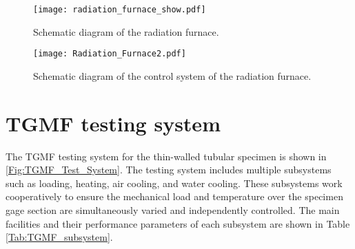 \begin{figure}[!htp]
	\centering
	\texttt{[image: radiation\_furnace\_show.pdf]}
	\caption{Schematic diagram of the radiation furnace.}
	\label{Fig:radiation_furnace_show}
\end{figure}

\begin{figure}[!htp]
	\centering
	\texttt{[image: Radiation\_Furnace2.pdf]}
	\caption{Schematic diagram of the control system of the radiation furnace.}
	\label{Fig:Radiation_Furnace}
\end{figure}





\section{TGMF testing system}
\noindent
The TGMF testing system for the thin-walled tubular specimen is shown in \ref{Fig:TGMF_Test_System}. The testing system includes multiple subsystems such as loading, heating,  air cooling, and water cooling. These subsystems work cooperatively to ensure the mechanical load and temperature over the specimen gage section are simultaneously varied and independently controlled. The main facilities and their performance parameters of each subsystem are shown in Table \ref{Tab:TGMF_subsystem}.

